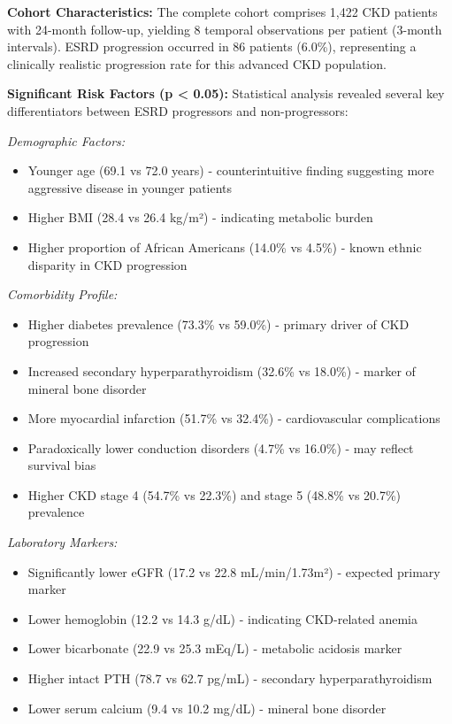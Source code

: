 \documentclass[letterpaper]{article}
\begin{document}
\textbf{Cohort Characteristics:} The complete cohort comprises 1,422 CKD patients with 24-month follow-up, yielding 8 temporal observations per patient (3-month intervals). ESRD progression occurred in 86 patients (6.0\%), representing a clinically realistic progression rate for this advanced CKD population.

\textbf{Significant Risk Factors (p < 0.05):} Statistical analysis revealed several key differentiators between ESRD progressors and non-progressors:

\textit{Demographic Factors:}
\begin{itemize}
    \item Younger age (69.1 vs 72.0 years) - counterintuitive finding suggesting more aggressive disease in younger patients
    \item Higher BMI (28.4 vs 26.4 kg/m²) - indicating metabolic burden
    \item Higher proportion of African Americans (14.0\% vs 4.5\%) - known ethnic disparity in CKD progression
\end{itemize}

\textit{Comorbidity Profile:}
\begin{itemize}
    \item Higher diabetes prevalence (73.3\% vs 59.0\%) - primary driver of CKD progression
    \item Increased secondary hyperparathyroidism (32.6\% vs 18.0\%) - marker of mineral bone disorder
    \item More myocardial infarction (51.7\% vs 32.4\%) - cardiovascular complications
    \item Paradoxically lower conduction disorders (4.7\% vs 16.0\%) - may reflect survival bias
    \item Higher CKD stage 4 (54.7\% vs 22.3\%) and stage 5 (48.8\% vs 20.7\%) prevalence
\end{itemize}

\textit{Laboratory Markers:}
\begin{itemize}
    \item Significantly lower eGFR (17.2 vs 22.8 mL/min/1.73m²) - expected primary marker
    \item Lower hemoglobin (12.2 vs 14.3 g/dL) - indicating CKD-related anemia
    \item Lower bicarbonate (22.9 vs 25.3 mEq/L) - metabolic acidosis marker
    \item Higher intact PTH (78.7 vs 62.7 pg/mL) - secondary hyperparathyroidism
    \item Lower serum calcium (9.4 vs 10.2 mg/dL) - mineral bone disorder
\end{itemize}
\end{document}

